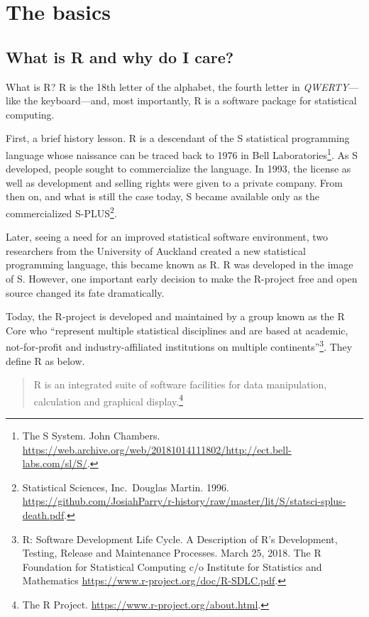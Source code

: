 \documentclass[
]{book}
\begin{document}
\hypertarget{the-basics}{%
\chapter{The basics}\label{the-basics}}

\hypertarget{what-is-r-and-why-do-i-care}{%
\section{What is R and why do I care?}\label{what-is-r-and-why-do-i-care}}

What is R? R is the 18th letter of the alphabet, the fourth letter in \emph{QWERTY}---like the keyboard---and, most importantly, R is a software package for statistical computing.

First, a brief history lesson. R is a descendant of the S statistical programming language whose naissance can be traced back to 1976 in Bell Laboratories\footnote{The S System. John Chambers. \url{https://web.archive.org/web/20181014111802/http://ect.bell-labs.com/sl/S/}.}. As S developed, people sought to commercialize the language. In 1993, the license as well as development and selling rights were given to a private company. From then on, and what is still the case today, S became available only as the commercialized S-PLUS\footnote{Statistical Sciences, Inc.~Douglas Martin. 1996. \url{https://github.com/JosiahParry/r-history/raw/master/lit/S/statsci-splus-death.pdf}.}.

Later, seeing a need for an improved statistical software environment, two researchers from the University of Auckland created a new statistical programming language, this became known as R. R was developed in the image of S. However, one important early decision to make the R-project free and open source changed its fate dramatically.

Today, the R-project is developed and maintained by a group known as the R Core who ``represent multiple statistical disciplines and are based at academic, not-for-profit and industry-affiliated institutions on multiple continents''\footnote{R: Software Development Life Cycle. A Description of R's Development, Testing, Release and Maintenance Processes. March 25, 2018. The R Foundation for Statistical Computing c/o Institute for Statistics and Mathematics \url{https://www.r-project.org/doc/R-SDLC.pdf}.}. They define R as below.

\begin{quote}
R is an integrated suite of software facilities for data manipulation, calculation and graphical display.\footnote{The R Project. \url{https://www.r-project.org/about.html}.}
\end{quote}
\end{document}
